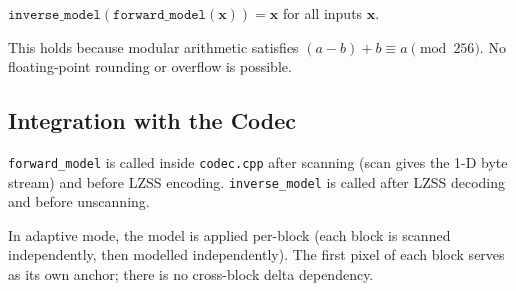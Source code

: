 $\texttt{inverse\_model}(\texttt{forward\_model}(\mathbf{x})) = \mathbf{x}$
for all inputs $\mathbf{x}$.

This holds because modular arithmetic satisfies
$(a - b) + b \equiv a \pmod{256}$.
No floating-point rounding or overflow is possible.

\subsection{Integration with the Codec}

\texttt{forward\_model} is called inside \texttt{codec.cpp} after scanning (scan gives the
1-D byte stream) and before LZSS encoding.
\texttt{inverse\_model} is called after LZSS decoding and before unscanning.

In adaptive mode, the model is applied per-block (each block is scanned independently,
then modelled independently).
The first pixel of each block serves as its own anchor; there is no cross-block
delta dependency.
